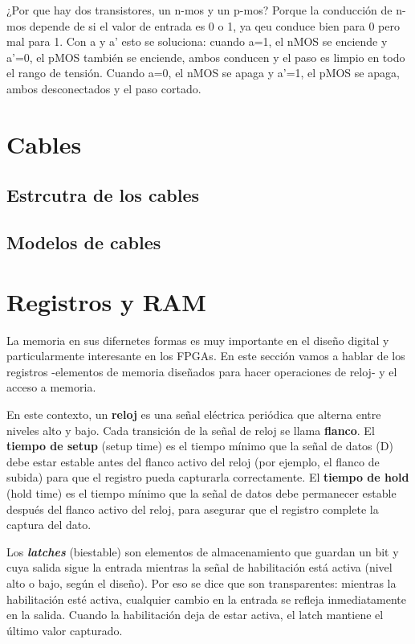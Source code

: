 ¿Por  que hay dos transistores, un n-mos y un p-mos? Porque la conducción de n-mos depende de si el valor de entrada es 0 o 1, ya qeu conduce bien para 0 pero mal para 1. Con a y a' esto se soluciona: cuando a=1, el nMOS se enciende y a'=0, el pMOS también se enciende, ambos conducen y el paso es limpio en todo el rango de tensión. Cuando a=0, el nMOS se apaga y a'=1, el pMOS se apaga, ambos desconectados y el paso cortado.

\section{Cables}

\subsection{Estrcutra de los cables}

\subsection{Modelos de cables}


\section{Registros y RAM}

La memoria en sus difernetes formas es muy importante en el diseño digital y particularmente interesante en los FPGAs. En este sección vamos a hablar de los registros -elementos de memoria diseñados para hacer operaciones de reloj- y el acceso a memoria.  

En este contexto, un \textbf{reloj} es una señal eléctrica periódica que alterna entre niveles alto y bajo.  Cada transición de la señal de reloj se llama \textbf{flanco}. El \textbf{tiempo de setup} (setup time) es el tiempo mínimo que la señal de datos (D) debe estar estable antes del flanco activo del reloj (por ejemplo, el flanco de subida) para que el registro pueda capturarla correctamente. El \textbf{tiempo de hold} (hold time) es el tiempo mínimo que la señal de datos debe permanecer estable después del flanco activo del reloj, para asegurar que el registro complete la captura del dato.

Los \textbf{\textit{latches}} (biestable) son elementos de almacenamiento que guardan un bit y cuya salida sigue la entrada mientras la señal de habilitación está activa (nivel alto o bajo, según el diseño). Por eso se dice que son transparentes: mientras la habilitación esté activa, cualquier cambio en la entrada se refleja inmediatamente en la salida. Cuando la habilitación deja de estar activa, el latch mantiene el último valor capturado.

